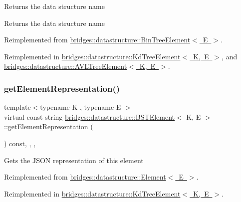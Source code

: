 Returns the data structure name \begin{DoxyReturn}{Returns}
the data structure name 
\end{DoxyReturn}


Reimplemented from \mbox{\hyperlink{classbridges_1_1datastructure_1_1_bin_tree_element_aef86e3663785972251547e409fdc757b}{bridges\+::datastructure\+::\+Bin\+Tree\+Element$<$ E $>$}}.



Reimplemented in \mbox{\hyperlink{classbridges_1_1datastructure_1_1_kd_tree_element_a76f6d9bfadfdec09d0a8564aa0e33235}{bridges\+::datastructure\+::\+Kd\+Tree\+Element$<$ K, E $>$}}, and \mbox{\hyperlink{classbridges_1_1datastructure_1_1_a_v_l_tree_element_ab04d1e9ad4630e408041e8137dc9854a}{bridges\+::datastructure\+::\+A\+V\+L\+Tree\+Element$<$ K, E $>$}}.

\mbox{\label{classbridges_1_1datastructure_1_1_b_s_t_element_a8f962a01b6e0eff59abeee7768264fd9}} 
\subsubsection{\texorpdfstring{getElementRepresentation()}{getElementRepresentation()}}
{\footnotesize\ttfamily template$<$typename K , typename E $>$ \\
virtual const string \mbox{\hyperlink{classbridges_1_1datastructure_1_1_b_s_t_element}{bridges\+::datastructure\+::\+B\+S\+T\+Element}}$<$ K, E $>$\+::get\+Element\+Representation (\begin{DoxyParamCaption}{ }\end{DoxyParamCaption}) const\hspace{0.3cm}{\ttfamily [inline]}, {\ttfamily [override]}, {\ttfamily [protected]}, {\ttfamily [virtual]}}

Gets the J\+S\+ON representation of this element 

Reimplemented from \mbox{\hyperlink{classbridges_1_1datastructure_1_1_element_a285fc51d6dfcb8bff2d72f7e4addfe6d}{bridges\+::datastructure\+::\+Element$<$ E $>$}}.



Reimplemented in \mbox{\hyperlink{classbridges_1_1datastructure_1_1_kd_tree_element_a5413ecaf152e3df5fb45dd85da812888}{bridges\+::datastructure\+::\+Kd\+Tree\+Element$<$ K, E $>$}}.

